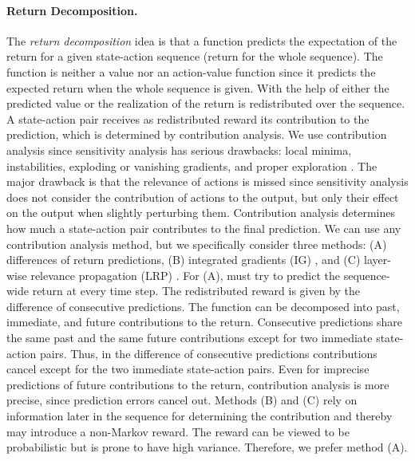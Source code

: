 \documentclass{article}
\begin{document}
\paragraph{Return Decomposition.}
\label{para:returnDecomposition}
The {\em return decomposition} idea is 
that a function  predicts the expectation
of the return
for a given state-action sequence (return for the whole sequence).
The function  is neither a value nor an action-value function
since it predicts the expected return when the whole sequence is given.
With the help of  either the predicted value or
the realization of the return is redistributed over
the sequence. 
A state-action pair receives as redistributed reward
its contribution to the prediction, which
is determined by contribution analysis.
We use contribution analysis since sensitivity analysis has serious drawbacks:
local minima, instabilities, exploding or vanishing
gradients, and proper exploration
\cite{Hochreiter:90,Schmidhuber:90diff}.
The major drawback is that
the relevance of actions is missed
since sensitivity analysis does not consider the contribution of actions to 
the output,
but only their effect on the output when slightly perturbing them.
Contribution analysis
determines how much a state-action pair contributes to the final prediction.
We can use any contribution analysis method, but
we specifically consider three methods:
(A) differences of return predictions,
(B) integrated gradients (IG) \cite{Sundararajan:17}, and
(C) layer-wise relevance propagation (LRP) \cite{Bach:15}.
For (A),  must try to predict the  
sequence-wide return at every time step.
The redistributed reward is given by 
the difference of consecutive predictions. 
The function  can be decomposed into
past, immediate, and future contributions to the return.
Consecutive predictions share the same past and the same
future contributions except for two immediate state-action pairs.
Thus, in the difference of consecutive predictions 
contributions cancel except for the two immediate state-action pairs.
Even for imprecise predictions of future contributions to the return, 
contribution analysis is more precise, 
since prediction errors cancel out.
Methods (B) and (C) rely on information later in the sequence for
determining the contribution and thereby may introduce a non-Markov reward.
The reward can be viewed to be probabilistic
but is prone to have high variance. 
Therefore, we prefer method (A).
\end{document}
